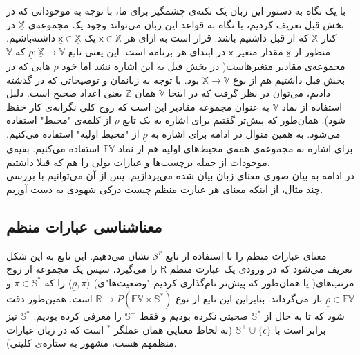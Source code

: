 با یک نگاه به دستور این زبان یک نکته‌ی چشمگیر برای ما، با توجه به موجوداتی که در بخش قبل تعریف کردیم، با نگاه به قواعد این زبان می‌تواند وجود یک مجموعه‌ی
$\mathbb{\underline{X}}$
در کنار 
$\mathbb{X}$
که از قبل داشتیم باشد. قرار است به ازای هر 
$\mathsf{x}\in\mathbb{X}$
یک 
$\mathsf{\underline{x}}\in\mathbb{\underline{X}}$
داشته‌باشیم. منظور از 
$\mathsf{\underline{x}}$
مقدار متغیر 
$\mathsf{x}$
در ابتدای هر برنامه است. این یعنی تابع
$\underline{\rho}: \mathbb{\underline{X}} \rightarrow \mathbb{V}$
که 
$\mathbb{V}$
مجموعه‌ی مقادیر متغیرهاست( در بخش قبل به این اشاره نشد اما خود
$\rho$
هایی که در بخش قبل داشتیم هم از نوع
$\mathbb{X} \rightarrow \mathbb{V}$
بود. با توجه به زبانمان و توضیحاتی که در گذشته دادیم، می‌توان در نظر گرفت که در اینجا 
$\mathbb{V}$
همان 
$\mathbb{Z}$
یعنی اعداد صحیح است. دلیل استفاده از نماد
$\mathbb{V}$
به عنوان مجموعه مقادیر این است که روح کلی نگرانه‌ی کار حفظ شود). همان‌طور که پیش‌تر گفتیم برای اشاره به یک تابع
$\rho$
از کلمه‌ی "محیط" استفاده می‌شود. به همین منوال در ادامه برای اشاره‌ به 
$\underline{\rho}$
از "محیط اولیه" استفاده می‌کنیم. برای اشاره به مجموعه‌ی همه‌ی محیط‌های اولیه هم از نماد 
$\underline{\mathbb{EV}}$
استفاده می‌کنیم.
بقیه‌ی موجودات از جمله برچسب‌ها و عبارات بولی را هم که قبلا داشتیم.\\
در ادامه به بیان صوری معنای زبان بیان شده می‌پردازیم. پس از آن می‌توانیم با بررسی چند مثال، از اینکه معنای هر عبارت منظم چیست درکی شهودی به دست آوریم.\\

\subsection{معناشناسی عبارات منظم}
معنای عبارات منظم را با استفاده از تابع 
$\mathcal{S}^r$
نشان می‌دهیم. این تابع به این شکل تعریف می‌شود که در ورودی یک عبارت منظم 
$\mathsf{R}$
را می‌گیرد، سپس یک مجموعه از زوج مرتب‌های( یا همان‌طور که پیش‌تر نام‌گذاری کردیم "وضعیت‌ها"ی)
$\langle\underline{\rho} , \pi\rangle$
را که 
$\pi \in \mathbb{S^*}$
و 
$\underline{\rho} \in \underline{\mathbb{EV}}$
باز می‌گرداند. بنابراین این تابع از نوع
$\mathbb{R} \rightarrow \mathit{P} (\mathbb{\underline{EV} \times S^*})$
است. همین‌طور دقت شود که تا به حال از 
$\mathbb{S}^*$
صحبتی نکرده بودیم و فقط 
$\mathbb{S}^+$
را معرفی کرده بودیم. 
$\mathbb{S}^*$
نیز برابر است با
$\mathbb{S}^+ \cup \{\epsilon\}$ 
(به لحاظ معنایی همان عملگر
$^*$
است که در زبان عبارات منظمهم هست، مشهور به ستاره‌ی کلینی).

